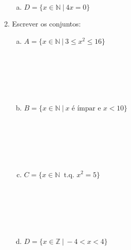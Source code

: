\documentclass[a4paper,14pt]{article}
\begin{document}
\begin{multicols}{2}
\begin{enumerate}
\begin{enumerate}[a)]
    				\item $D = \{x \in \mathbb{N}~|~4x = 0\}$
    			\end{enumerate}
    			\item Escrever os conjuntos:
    			\begin{enumerate}[a)]
    				\item $A = \{x \in \mathbb{N}~|~3 \leq x^2 \leq 16\}$  \\\\\\\\\\\\
    				\item $B = \{x \in \mathbb{N}~|~x \text{~é ímpar e~} x < 10\}$ \\\\\\\\\\\\
    				\item $C = \{x \in \mathbb{N}~\text{~t.q.~} x^2 = 5\}$ \\\\\\\\\\\\
    				\item $D = \{x \in \mathbb{Z}~|~-4 < x < 4\}$ \\\\\\\\\\\\
    			\end{enumerate}
    		\end{enumerate}
    		$~$
	\end{multicols}
\end{document}
